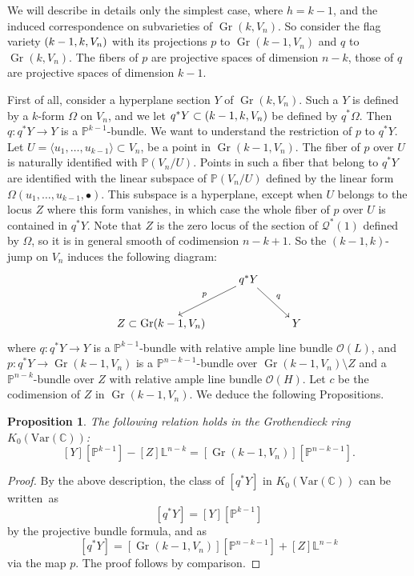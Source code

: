 \documentclass[11pt]{article}
\newcommand{\NoChangel}[1]{%
\expandafter\let\csname old\string#1\endcsname=#1
\let#1=\relax
\newcommand{#1}{\mathcode`l="716C\csname old\string#1\endcsname\mathcode`l="7160 }%
}
\newcommand{\sbullet}{{\scriptstyle\bullet}}
\newcommand{\Var}{\mathrm{Var}}
\let\mathcal\mathscr
\theoremstyle{plain}
\newtheorem{prop}[theorem]{Proposition}
\theoremstyle{definition}
\DeclareMathOperator{\Gr}{Gr}
\DeclareMathOperator{\Fl}{Fl}\NoChangel{\Fl}
\newcommand{\CC}{\mathbb{C}}
\newcommand{\LL}{\mathbb{L}}
\newcommand{\PP}{\mathbb{P}}
\newcommand{\sheaf}[1]{\mathcal{#1}}
\newcommand{\ko}{\sheaf{O}}\let\OO\ko\let\cO\ko
\newcommand{\kq}{\sheaf{Q}}
\begin{document}
We will describe in details only the simplest case, where $h=k-1$, and the induced correspondence
on subvarieties of $\Gr(k,V_n)$. So consider
the flag variety $\Fl(k-1,k,V_n)$ with its projections $p$ to $\Gr(k-1,V_n)$ and $q$
to $\Gr(k,V_n)$. The fibers of $p$ are projective spaces of dimension $n-k$, those of
$q$ are projective spaces of dimension $k-1$.

First of all, consider a hyperplane section $Y$ of $\Gr(k,V_n)$. Such a $Y$ is defined
by a $k$-form $\Omega$ on $V_n$, and we let $q^* Y \subset \Fl(k-1,k,V_n)$ be defined by $q^*\Omega$.
Then $q : q^* Y \to Y$ is a $\PP^{k-1}$-bundle. We want to understand the restriction of $p$ to $q^*Y$.
Let $U=\langle u_1,\ldots, u_{k-1}\rangle \subset V_n$, be a point in $\Gr(k-1,V_n)$. The fiber of $p$ over $U$ is naturally identified with $\PP(V_n/U)$. Points in such a fiber that belong to $q^*Y$ are identified with the linear subspace of $\PP(V_n/U)$
defined by the linear form $\Omega (u_1,\ldots, u_{k-1}, \sbullet)$. This subspace is a hyperplane,
except when $U$ belongs to the locus $Z$ where this form vanishes, in which case the whole
fiber of $p$ over $U$ is contained in $q^*Y$. Note that $Z$ is the zero locus of the section
of $\kq^*(1)$ defined by $\Omega$, so it is in general smooth of codimension $n-k+1$.
So the $(k-1,k)$-jump on $V_n$ induces the following diagram:
\[
\xymatrix{
& q^*Y \ar@{->}[ld]_-{p}\ar@{->}[rd]^-{q} & \\
Z\subset \Gr(k-1,V_n) & & Y
}
\]
where $q: q^*Y \to Y$ is a $\PP^{k-1}$-bundle with relative ample line bundle $\ko(L)$, and
$p: q^* Y \to \Gr(k-1,V_n)$ is a
$\PP^{n-k-1}$-bundle over $\Gr(k-1,V_n)\setminus Z$ and a $\PP^{n-k}$-bundle
over $Z$ with relative ample line bundle $\ko(H)$. Let $c$ be the codimension of $Z$ in $\Gr(k-1,V_n)$.
We deduce the following Propositions.

\begin{prop}\label{prop:K0-jump}
The following relation holds in the Grothendieck ring $K_0(\Var(\CC))$:%
\begin{equation*}\label{eq:rel-in-K0-jump}
[Y][\PP^{k-1}]-[Z]\LL^{n-k}=[\Gr(k-1,V_n)][\PP^{n-k-1}].
\end{equation*}
\end{prop}

\begin{proof}
By the above description, the class of $[q^*Y]$ in $K_0(\Var(\CC))$ can be written~as%
\begin{equation}\label{eq:jumping-diagram-Hsection}
[q^*Y]=[Y][\PP^{k-1}]
\end{equation}
by the projective bundle formula, and as
\[
[q^*Y]=[\Gr(k-1,V_n)][\PP^{n-k-1}] + [Z]\LL^{n-k}
\]
via the map $p$. The proof follows by comparison.
\end{proof}
\end{document}
